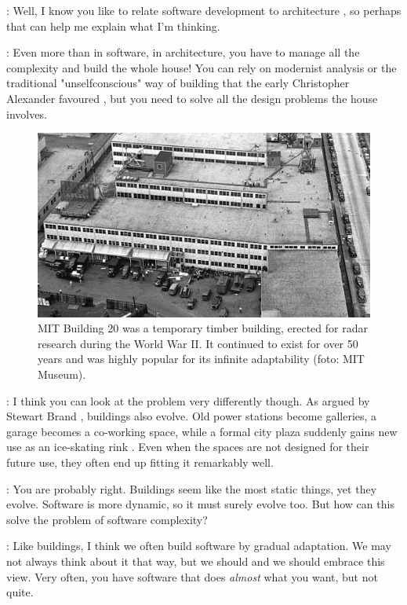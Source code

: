 \documentclass[runningheads]{llncs}
\newcommand{\T}{Tomas}
\newcommand{\J}{Joel}
\newcommand{\says}[2][gg]{\vspace{0.5em}\noindent\hangindent=0.5cm{\textsc{#1}}: #2}
\begin{document}
\says[\J]{Well, I know you like to relate software development to architecture \cite{petricek-2021-architecture}, so perhaps that can help me explain what I'm thinking.}

\says[\T]{Even more than in software, in architecture, you have to manage all the complexity and build the whole house! You can rely on modernist analysis or the traditional "unselfconscious" way of building that the early Christopher Alexander favoured \cite{alexander-1964-notes}, but you need to solve all the design problems the house involves.}

\begin{figure}[t]
\centering
\includegraphics[scale=0.33]{figures/mit20.jpg}
\caption{MIT Building 20 was a temporary timber building, erected for radar research during the World War II. It continued to exist for over 50 years and was highly popular for its infinite
adaptability \cite{brand-1994-buildings} (foto: MIT Museum).}
\label{fig:mit20}
\end{figure}

\says[\J]{I think you can look at the problem very differently though. As argued by Stewart Brand \cite{brand-1994-buildings}, buildings also evolve. Old power stations become galleries, a garage becomes a co-working space, while a formal city plaza suddenly gains new use as an ice-skating rink \cite{cohen-1974-context}. Even when the spaces are not designed for their future use, they often end up fitting it remarkably well.}

\says[\T]{You are probably right. Buildings seem like the most static things, yet they evolve. Software is more dynamic, so it must surely evolve too. But how can this solve the problem of software complexity?}

\says[\J]{Like buildings, I think we often build software by gradual adaptation. We may not always think about it that way, but we should and we should embrace this view. Very often, you have software that does \emph{almost} what you want, but not quite.}
\end{document}
